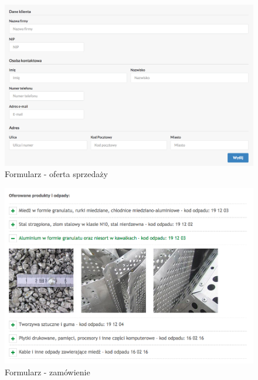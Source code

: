 \documentclass[paper=a4, fontsize=12pt]{scrartcl}
\numberwithin{equation}{section}		%
\numberwithin{figure}{section}			%
\numberwithin{table}{section}				%
\begin{document}
	\begin{figure}[H]
		\centering
		\centerline{\includegraphics[width=1.2\textwidth]{partials/2-wymagania/dokumenty/oferta-firma.png}}
		\caption{Formularz - oferta sprzedaży}
	\end{figure}

	\begin{figure}[H]
		\centering
		\centerline{\includegraphics[width=1.2\textwidth]{partials/2-wymagania/dokumenty/zamowienie.png}}
		\caption{Formularz - zamówienie}
	\end{figure}	
\end{document}
